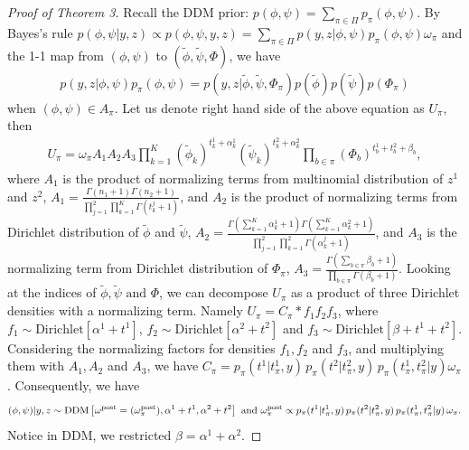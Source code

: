 \documentclass[aoas,preprint]{imsart}
\begin{document}
\begin{proof}[Proof of Theorem 3]
Recall the DDM prior: $p(\phi,\psi) = \sum_{\pi \in \Pi} p_\pi(\phi,\psi)$. 
By Bayes's rule $p(\phi,\psi | y,z) \propto p(\phi,\psi, y, z) = \sum_{\pi \in \Pi}  p(y, z | \phi,\psi) p_\pi(\phi,\psi)\omega_\pi$
and the 1-1 map from $(\phi,\psi)$ to $(\tilde \phi, \tilde \psi, \Phi)$, we have
\begin{eqnarray*}
p(y, z | \phi,\psi) p_\pi(\phi,\psi) = p(y, z | \tilde{\phi} , \tilde{\psi}, \Phi_\pi) p(\tilde{\phi}) p (\tilde{\psi}) p(\Phi_\pi)
\end{eqnarray*}
when $(\phi,\psi) \in A_\pi$.
Let us denote right hand side of the above equation as $U_\pi$, then
\begin{eqnarray*}
U_\pi = \omega_\pi A_1 A_2 A_3\prod_{k = 1}^K (\tilde{ \phi }_k)^{t_k^1 + \alpha_k^1} (\tilde{ \psi }_k)^{t_k^2 + \alpha_k^2}   \prod_{b \in \pi} (\Phi_b)^{t_b^1 + t_b^2 + \beta_b},
\end{eqnarray*}
where $A_1$ is the product of normalizing terms from multinomial distribution of $z^1$ and $z^2$, $A_1 =  \frac{\Gamma(n_1 + 1)\Gamma(n_2 + 1)}{\prod_{j = 1}^2\prod_{k = 1}^K \Gamma(t_k^j + 1) } $, and
$A_2$ is the product of normalizing terms from Dirichlet distribution of $\tilde{\phi}$ and $\tilde{\psi}$,
$A_2 = \frac{ \Gamma( \sum_{k = 1}^K \alpha_k^1 + 1)  \Gamma( \sum_{k = 1}^K \alpha_k^2 + 1)}{ \prod_{j = 1}^2 \prod_{k = 1}^2 \Gamma(\alpha_k^j + 1)}$, and
$A_3$ is the normalizing term from Dirichlet distribution of $\Phi_\pi$, $A_3 = \frac{\Gamma(\sum_{b \in \pi } \beta_b + 1)}{\prod_{b\in \pi} \Gamma(\beta_b + 1)}$.  Looking at the indices of $\tilde \phi, \tilde \psi \text{ and } \Phi$, we can decompose $U_\pi$ as a product of three Dirichlet densities with a normalizing term. 
Namely $U_\pi = C_\pi * f_1 f_2 f_3$, where
$f_1 \sim \text{Dirichlet}[\alpha^1 + t^1]$, $f_2 \sim \text{Dirichlet}[\alpha^2 + t^2]$ and $f_3 \sim \text{Dirichlet}[\beta + t^1 + t^2]$.
Considering the normalizing factors for densities $f_1,f_2$ and $f_3$, and multiplying them with $A_1, A_2$ and $A_3$,
we have $C_\pi =  p_\pi(t^1 | t^1_{\pi},y)\, p_\pi(t^2|  t^2_{\pi},y )
 \, p_\pi( t^1_{\pi}, t^2_{\pi} | y ) \omega_\pi$.  Consequently, we have 
 \begin{eqnarray*}
 (\phi,\psi)|y,z  \sim {\mbox {\rm DDM}}\left[ \omega^{\rm post}=(\omega^{\rm post}_\pi), \alpha^1 + t^1, \alpha^2 + t^2  \right] \text{ and } \omega^{\rm post}_\pi \propto 
 p_\pi(t^1 | t^1_{\pi},y)\, p_\pi(t^2|  t^2_{\pi},y )
 \, p_\pi( t^1_{\pi}, t^2_{\pi} | y ) \, \omega_\pi.
 \end{eqnarray*}
 Notice in DDM, we restricted $\beta = \alpha^1 + \alpha^2$.

\end{proof}
\end{document}
